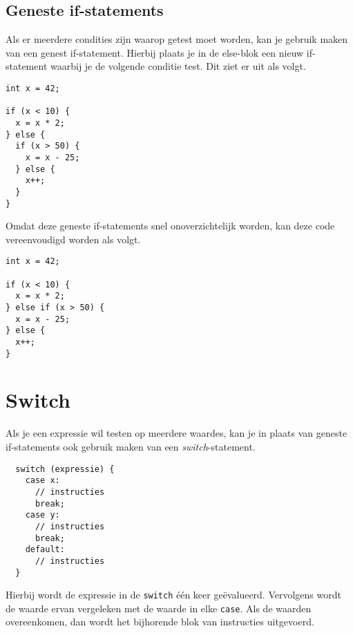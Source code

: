 \documentclass[11pt,fleqn]{book} %
\begin{document}
\subsection{Geneste if-statements}
Als er meerdere condities zijn waarop getest moet worden, kan je gebruik maken van een genest if-statement. Hierbij plaats je in de else-blok een nieuw if-statement waarbij je de volgende conditie test. Dit ziet er uit als volgt.

\begin{example}
	\phantom{ }
	\begin{verbatim}
int x = 42;

if (x < 10) {
  x = x * 2;
} else {
  if (x > 50) {
    x = x - 25;
  } else {
    x++;
  }
}
	\end{verbatim}
\end{example}

\noindent
Omdat deze geneste if-statements snel onoverzichtelijk worden, kan deze code vereenvoudigd worden als volgt.

\begin{example}[Else-if]
	\phantom{ }
	\begin{verbatim}
int x = 42;

if (x < 10) {
  x = x * 2;
} else if (x > 50) {
  x = x - 25;
} else {
  x++;
}
	\end{verbatim}
\end{example}

\section{Switch}
Als je een expressie wil testen op meerdere waardes, kan je in plaats van geneste if-statements ook gebruik maken van een \emph{switch}-statement.

\begin{definition}[Switch]
	\phantom{ }
	\begin{verbatim}
  switch (expressie) {
    case x:
      // instructies
      break;
    case y:
      // instructies
      break;
    default:
      // instructies
  }
	\end{verbatim}
\end{definition}

\noindent
Hierbij wordt de expressie in de \texttt{switch} één keer geëvalueerd. Vervolgens wordt de waarde ervan vergeleken met de waarde in elke \texttt{case}. Als de waarden overeenkomen, dan wordt het bijhorende blok van instructies uitgevoerd. 
\end{document}
